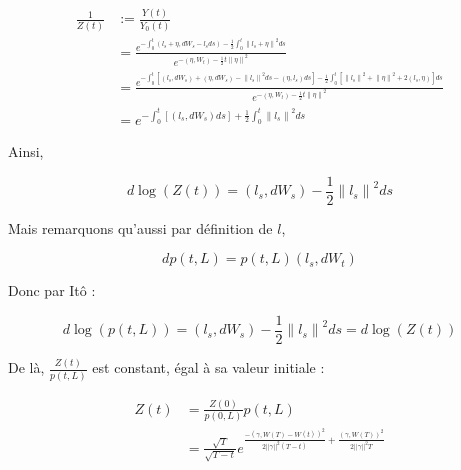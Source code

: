 \documentclass[../finalreport.tex]{subfiles}
\begin{document}
\begin{displaymath}
	\begin{split}
	\frac{1}{Z \left( t \right)} &:= \frac{Y \left( t \right)}{Y_0 \left( t \right)} \\
	 &= \frac{e^{- \int_{0}^{t} \left( l_{s} + \eta, dW_{s} - l_s ds \right) - \frac{1}{2} \int_{0}^{t} {\| l_{s} + \eta \|}^{2} ds}}{e^{- \left( \eta, W_{t} \right)-\frac{1}{2} t {\| \eta \|}^{2}}} \\
	&= \frac{e^{- \int_{0}^{t} \left[ \left( l_s, dW_{s} \right) + \left( \eta, dW_{s} \right) - {\| l_{s} \|}^{2} ds - \left( \eta, l_s\right) ds \right]  - \frac{1}{2} \int_{0}^{t} \left[ {\| l_{s} \|}^{2} + {\| \eta \|}^{2} + 2 \left(l_s, \eta \right) \right] ds}}{e^{- \left( \eta, W_{t} \right)-\frac{1}{2} t {\| \eta \|}^{2}}} \\
	&= e^{- \int_{0}^{t} \left[ \left( l_s, dW_{s} \right) ds \right] + \frac{1}{2} \int_{0}^{t} {\| l_{s} \|}^{2} ds}
	\end{split}
\end{displaymath}

\par Ainsi, 

\begin{displaymath}
d \log \left( Z \left( t \right) \right) = \left(l_s, d W_s \right) - \frac{1}{2} {\| l_{s} \|}^{2} ds
\end{displaymath}

\par Mais remarquons qu'aussi par définition de $l$, 

\begin{displaymath}
d p \left( t, L \right) =  p \left( t, L \right) \left( l_s, d W_t \right)
\end{displaymath}

\par Donc par Itô :

\begin{displaymath}
d \log \left( p \left( t, L \right) \right) = \left(l_s, d W_s \right) - \frac{1}{2} {\| l_{s} \|}^{2} ds = d \log \left( Z \left( t \right) \right)
\end{displaymath}

\par De là, $\frac{Z \left( t \right)}{ p \left( t, L \right) }$ est constant, égal à sa valeur initiale :

\begin{displaymath}
	\begin{split}
	Z \left( t \right) &= \frac{Z \left( 0 \right)}{ p \left( 0, L \right) } p \left( t, L \right) \\
	&= \frac{\sqrt{T}}{\sqrt{T - t}} e^{\frac{- \left( \gamma, W \left( T \right) - W \left( t \right) \right)^2}{2 ||\gamma||^2 \left( T - t \right)} + \frac{\left( \gamma, W \left( T \right) \right)^2}{2 ||\gamma||^2 T }}
	\end{split}
\end{displaymath}
\end{document}
